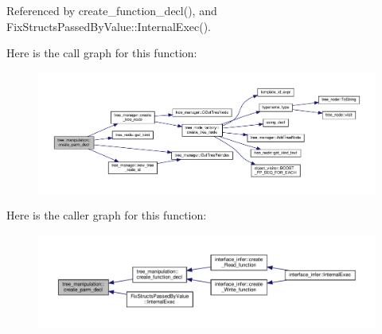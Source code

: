 Referenced by create\+\_\+function\+\_\+decl(), and Fix\+Structs\+Passed\+By\+Value\+::\+Internal\+Exec().

Here is the call graph for this function\+:
\nopagebreak
\begin{figure}[H]
\begin{center}
\leavevmode
\includegraphics[width=350pt]{d0/d99/classtree__manipulation_afdb65bb06cf5efd3516bf850d06e64b3_cgraph}
\end{center}
\end{figure}
Here is the caller graph for this function\+:
\nopagebreak
\begin{figure}[H]
\begin{center}
\leavevmode
\includegraphics[width=350pt]{d0/d99/classtree__manipulation_afdb65bb06cf5efd3516bf850d06e64b3_icgraph}
\end{center}
\end{figure}
\mbox{\label{classtree__manipulation_a6106305b8de3d51daede502c7fbfb540}} 
